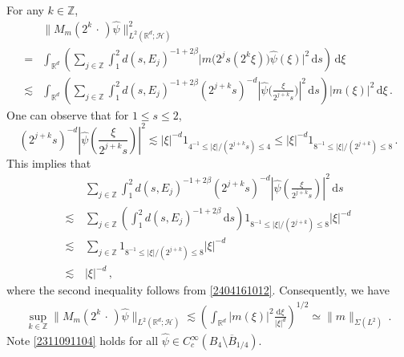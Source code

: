 \documentclass[11pt]{amsart}
\theoremstyle{plain}
\theoremstyle{definition}
\theoremstyle{remark}
\numberwithin{equation}{section}
\newcommand{\cH}{\mathcal{H}}
\newcommand{\bR}{\mathbb{R}}
\newcommand{\bZ}{\mathbb{Z}}
\newcommand{\dd}{\,\mathrm{d}}
\begin{document}
For any $k\in\bZ$,  
\begin{align*}
&\|M_m(2^k\,\cdot\,)\widehat{\psi}\|_{L^2(\bR^d;\cH)}^2\\
=&\int_{\bR^d}\left(\sum_{j\in\bZ}\int_1^2d(s,E_j)^{-1+2\beta}\big|m\big(2^js(2^k\xi)\big)\widehat{\psi}(\xi)\big|^2\dd s\right)\dd \xi\\
\lesssim & \int_{\bR^d}\left(\sum_{j\in\bZ}\int_1^2d(s,E_j)^{-1+2\beta}(2^{j+k}s)^{-d}\left|\widehat{\psi}\Big(\frac{\xi}{2^{j+k}s}\Big)\right|^2\dd s\right) |m(\xi)|^2\dd \xi\,.
\end{align*}
One can observe that for $1\leq s \leq 2$, 
$$
\left(2^{j+k}s\right)^{-d}\left|\widehat{\psi}\left(\frac{\xi}{2^{j+k}s}\right)\right|^2\lesssim |\xi|^{-d}1_{4^{-1}\leq |\xi|/(2^{j+k}s)\leq 4}\leq |\xi|^{-d}1_{8^{-1}\leq |\xi|/(2^{j+k})\leq 8}\,.
$$
This implies that
\begin{align*}
&\sum_{j\in\bZ}\int_1^2d(s,E_j)^{-1+2\beta}(2^{j+k}s)^{-d}\left|\widehat{\psi}\left(\frac{\xi}{2^{j+k}s}\right)\right|^2\dd s\\
\lesssim\, &\sum_{j\in\bZ}\left(\int_1^2d(s,E_j)^{-1+2\beta}\dd s\right) 1_{8^{-1}\leq |\xi|/(2^{j+k})\leq 8}|\xi|^{-d}\\
\lesssim\, &\sum_{j\in\bZ}1_{8^{-1}\leq |\xi|/(2^{j+k})\leq 8}|\xi|^{-d}\\
\lesssim\,& |\xi|^{-d}\,,
\end{align*}
where the second inequality follows from \eqref{2404161012}.
Consequently, we have
\begin{align}\label{2311091104}
\sup_{k\in\bZ}\|M_m(2^k\,\cdot\,)\widehat{\psi}\|_{L^2(\bR^d;\cH)}\lesssim \left(\int_{\bR^d}|m(\xi)|^2\frac{\mathrm{d}\xi}{|\xi|^d}\right)^{1/2}\simeq \|m\|_{\Sigma(L^2)}\,.
\end{align}
Note \eqref{2311091104} holds for all $\widehat{\psi}\in C_c^{\infty}(B_4\setminus\overline{B}_{1/4})$.
\end{document}
